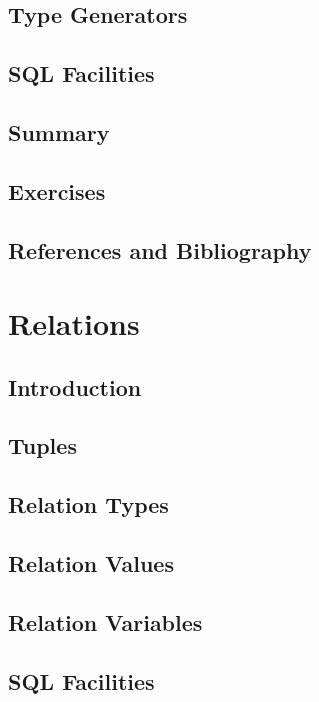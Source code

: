 \documentclass{book}
\begin{document}
\section{Type Generators}

\section{SQL Facilities}

\section{Summary}

\section{Exercises}

\section{References and Bibliography}





\chapter{Relations}

\section{Introduction}

\section{Tuples}

\section{Relation Types}

\section{Relation Values}

\section{Relation Variables}

\section{SQL Facilities}
\end{document}
